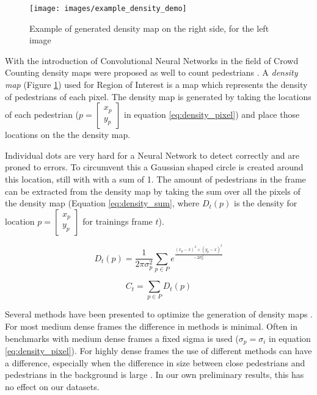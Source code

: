 \begin{figure}[h]
\centering
\texttt{[image: images/example\_density\_demo]}
\caption{Example of generated density map on the right side, for the left image}
\label{fig:density_map}
\end{figure}
With the introduction of Convolutional Neural Networks in the field of Crowd Counting density maps were proposed as well to count pedestrians \cite{Zhang2016, Liu2019, li2018csrnet}. A \emph{density map} (Figure \ref{fig:density_map}) used for Region of Interest is a map which represents the density of pedestrians of each pixel. The density map is generated by taking the locations of each pedestrian ($p=\begin{bmatrix} x_p \\ y_p \end{bmatrix}$ in equation \ref{eq:density_pixel}) and place those locations on the the density map.

Individual dots are very hard for a Neural Network to detect correctly and are proned to errors. To circumvent this a Gaussian shaped circle is created around this location, still with with a sum of 1. The amount of pedestrians in the frame can be extracted from the density map by taking the sum over all the pixels of the density map (Equation \ref{eq:density_sum}, where $D_t(p)$ is the density for location $p=\begin{bmatrix} x_p \\ y_p \end{bmatrix}$ for trainings frame $t$).

\begin{equation}
\label{eq:density_pixel}
	D_t(p) = \frac{1}{2 \pi \sigma_p^2}\sum_{p\in P} e^{\frac{(x_p-x)^2+(y_p-x)^2}{-2 \sigma_p^2}}
\end{equation}

\begin{equation}
	\label{eq:density_sum}
	C_t = \sum_{p\in P} D_t(p)
\end{equation}

Several methods have been presented to optimize the generation of density maps \cite{Zhang2016, li2018csrnet, Wan2019}. For most medium dense frames the difference in methods is minimal. Often in benchmarks with medium dense frames a fixed sigma is used ($\sigma_p=\sigma_i$ in equation \ref{eq:density_pixel}). For highly dense frames the use of different methods can have a difference, especially when the difference in size between close pedestrians and pedestrians in the background is large \cite{li2018csrnet}. In our own preliminary results, this has no effect on our datasets.

